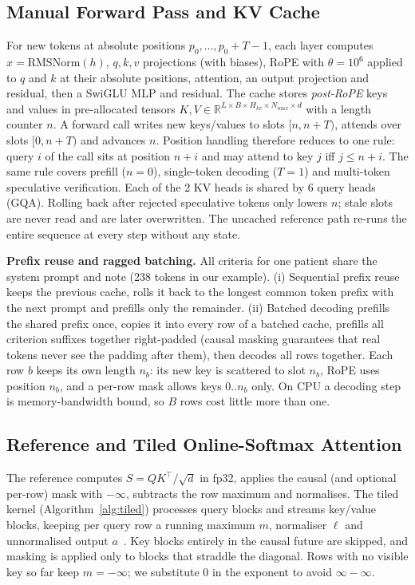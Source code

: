\documentclass[conference]{IEEEtran}
\begin{document}
\subsection{Manual Forward Pass and KV Cache}
For new tokens at absolute positions $p_0,\dots,p_0+T-1$, each layer computes $x=\mathrm{RMSNorm}(h)$, $q,k,v$ projections (with biases), RoPE with $\theta=10^6$ applied to $q$ and $k$ at their absolute positions, attention, an output projection and residual, then a SwiGLU MLP and residual. The cache stores \emph{post-RoPE} keys and values in pre-allocated tensors $K,V\in\mathbb{R}^{L\times B\times H_{kv}\times N_{max}\times d}$ with a length counter $n$. A forward call writes new keys/values to slots $[n, n+T)$, attends over slots $[0,n+T)$ and advances $n$. Position handling therefore reduces to one rule: query $i$ of the call sits at position $n+i$ and may attend to key $j$ iff $j\le n+i$. The same rule covers prefill ($n=0$), single-token decoding ($T=1$) and multi-token speculative verification. Each of the 2 KV heads is shared by 6 query heads (GQA). Rolling back after rejected speculative tokens only lowers $n$; stale slots are never read and are later overwritten. The uncached reference path re-runs the entire sequence at every step without any state.

\textbf{Prefix reuse and ragged batching.} All criteria for one patient share the system prompt and note (238 tokens in our example). (i) Sequential prefix reuse keeps the previous cache, rolls it back to the longest common token prefix with the next prompt and prefills only the remainder. (ii) Batched decoding prefills the shared prefix once, copies it into every row of a batched cache, prefills all criterion suffixes together right-padded (causal masking guarantees that real tokens never see the padding after them), then decodes all rows together. Each row $b$ keeps its own length $n_b$: its new key is scattered to slot $n_b$, RoPE uses position $n_b$, and a per-row mask allows keys $0..n_b$ only. On CPU a decoding step is memory-bandwidth bound, so $B$ rows cost little more than one.

\subsection{Reference and Tiled Online-Softmax Attention}
The reference computes $S=QK^\top/\sqrt{d}$ in fp32, applies the causal (and optional per-row) mask with $-\infty$, subtracts the row maximum and normalises. The tiled kernel (Algorithm~\ref{alg:tiled}) processes query blocks and streams key/value blocks, keeping per query row a running maximum $m$, normaliser $\ell$ and unnormalised output $a$~\cite{milakov2018online,dao2022flashattention}. Key blocks entirely in the causal future are skipped, and masking is applied only to blocks that straddle the diagonal. Rows with no visible key so far keep $m=-\infty$; we substitute 0 in the exponent to avoid $\infty-\infty$.
\end{document}

